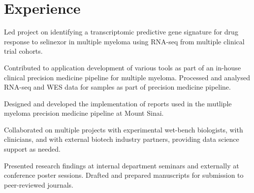 \begin{minipage}[t]{0.66\textwidth} %


\section{Experience}


\vspace{\topsep} %
\begin{tightitemize}
\item Led project on identifying a transcriptomic predictive gene signature for drug response to selinexor in multiple myeloma using RNA-seq from multiple clinical trial cohorts.
\item Contributed to application development of various tools as part of an in-house clinical precision medicine pipeline for multiple myeloma. Processed and analysed RNA-seq and WES data for samples as part of precision medicine pipeline.
\item Designed and developed the implementation of reports used in the mutliple myeloma precision medicine pipeline at Mount Sinai.
\item Collaborated on multiple projects with experimental wet-bench biologists, with clinicians, and with external biotech industry partners, providing data science support as needed. 
\item Presented research findings at internal department seminars and externally at conference poster sessions. Drafted and prepared manuscripts for submission to peer-reviewed journals.
\end{tightitemize}

\sectionspace %




\end{minipage}
